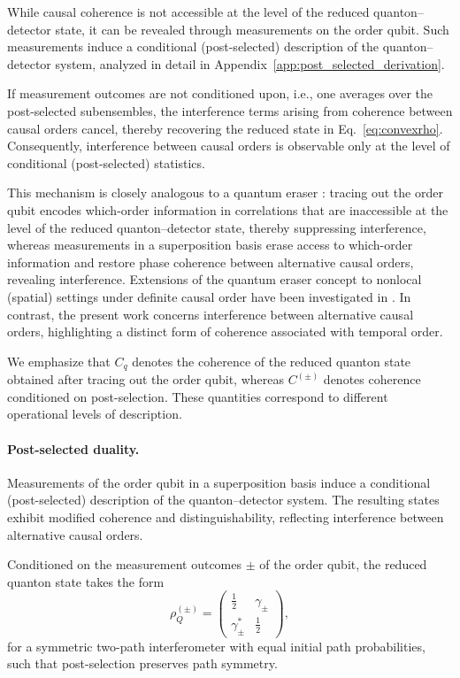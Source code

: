 \documentclass[aps,pra,reprint,superscriptaddress]{revtex4-2}
\begin{document}
While causal coherence is not accessible at the level of the reduced quanton--detector state, it can be revealed through measurements on the order qubit. Such measurements induce a conditional (post-selected) description of the quanton--detector system, analyzed in detail in Appendix~\ref{app:post_selected_derivation}.

If measurement outcomes are not conditioned upon, i.e., one averages over the post-selected subensembles, the interference terms arising from coherence between causal orders cancel, thereby recovering the reduced state in Eq.~\eqref{eq:convexrho}. Consequently, interference between causal orders is observable only at the level of conditional (post-selected) statistics.

This mechanism is closely analogous to a quantum eraser \cite{Scully1982,Walborn2002}: tracing out the order qubit encodes which-order information in correlations that are inaccessible at the level of the reduced quanton--detector state, thereby suppressing interference, whereas measurements in a superposition basis erase access to which-order information and restore phase coherence between alternative causal orders, revealing interference. Extensions of the quantum eraser concept to nonlocal (spatial) settings under definite causal order have been investigated in \cite{SiddiquiQureshi2016}. In contrast, the present work concerns interference between alternative causal orders, highlighting a distinct form of coherence associated with temporal order.

We emphasize that $C_q$ denotes the coherence of the reduced quanton state obtained after tracing out the order qubit, whereas $C^{(\pm)}$ denotes coherence conditioned on post-selection. These quantities correspond to different operational levels of description.

\paragraph*{Post-selected duality.}
Measurements of the order qubit in a superposition basis induce a conditional (post-selected) description of the quanton--detector system. The resulting states exhibit modified coherence and distinguishability, reflecting interference between alternative causal orders.

Conditioned on the measurement outcomes $\pm$ of the order qubit,
the reduced quanton state takes the form
\begin{equation}
\rho_Q^{(\pm)}
=
\begin{pmatrix}
\frac12 & \gamma_\pm \\
\gamma_\pm^* & \frac12
\end{pmatrix},
\end{equation}
for a symmetric two-path interferometer with equal initial path probabilities, such that post-selection preserves path symmetry.
\end{document}
